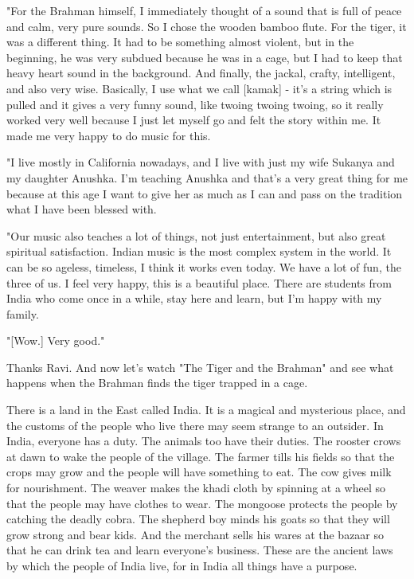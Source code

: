 "For the Brahman himself, I immediately thought of a sound that is full of peace and calm, very pure sounds. So I chose the wooden bamboo flute. For the tiger, it was a different thing. It had to be something almost violent, but in the beginning, he was very subdued because he was in a cage, but I had to keep that heavy heart sound in the background. And finally, the jackal, crafty, intelligent, and also very wise. Basically, I use what we call [kamak] - it's a string which is pulled and it gives a very funny sound, like twoing twoing twoing, so it really worked very well because I just let myself go and felt the story within me. It made me very happy to do music for this.

"I live mostly in California nowadays, and I live with just my wife Sukanya and my daughter Anushka. I'm teaching Anushka and that's a very great thing for me because at this age I want to give her as much as I can and pass on the tradition what I have been blessed with.

"Our music also teaches a lot of things, not just entertainment, but also great spiritual satisfaction. Indian music is the most complex system in the world. It can be so ageless, timeless, I think it works even today. We have a lot of fun, the three of us. I feel very happy, this is a beautiful place. There are students from India who come once in a while, stay here and learn, but I'm happy with my family.

"[Wow.] Very good."

Thanks Ravi. And now let's watch "The Tiger and the Brahman" and see what happens when the Brahman finds the tiger trapped in a cage.

There is a land in the East called India. It is a magical and mysterious place, and the customs of the people who live there may seem strange to an outsider. In India, everyone has a duty. The animals too have their duties. The rooster crows at dawn to wake the people of the village. The farmer tills his fields so that the crops may grow and the people will have something to eat. The cow gives milk for nourishment. The weaver makes the khadi cloth by spinning at a wheel so that the people may have clothes to wear. The mongoose protects the people by catching the deadly cobra. The shepherd boy minds his goats so that they will grow strong and bear kids. And the merchant sells his wares at the bazaar so that he can drink tea and learn everyone's business. These are the ancient laws by which the people of India live, for in India all things have a purpose.

